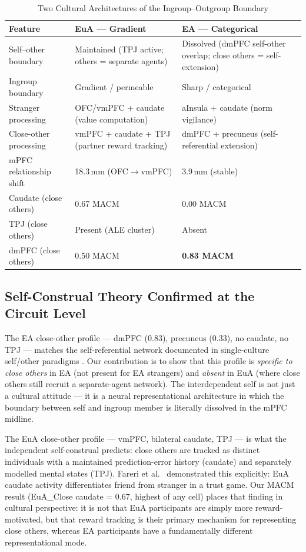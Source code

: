 \documentclass[11pt,a4paper]{article}
\begin{document}
\begin{table}[ht]
\centering\small
\caption{Two Cultural Architectures of the Ingroup--Outgroup Boundary}
\label{tab:architecture}
\renewcommand{\arraystretch}{1.4}
\begin{tabular}{p{3.5cm}p{5.0cm}p{5.5cm}}
\toprule
\textbf{Feature} & \textcolor{euaBlue}{\textbf{EuA — Gradient}} & \textcolor{eaRed}{\textbf{EA — Categorical}} \\
\midrule
Self--other boundary & Maintained (TPJ active; others = separate agents) & Dissolved (dmPFC self-other overlap; close others = self-extension) \\
Ingroup boundary & Gradient / permeable & Sharp / categorical \\
Stranger processing & OFC/vmPFC + caudate (value computation) & aInsula + caudate (norm vigilance) \\
Close-other processing & vmPFC + caudate + TPJ (partner reward tracking) & dmPFC + precuneus (self-referential extension) \\
mPFC relationship shift & 18.3\,mm (OFC$\to$vmPFC) & 3.9\,mm (stable) \\
Caudate (close others) & 0.67 MACM & 0.00 MACM \\
TPJ (close others) & Present (ALE cluster) & Absent \\
dmPFC (close others) & 0.50 MACM & \textbf{0.83 MACM} \\
\bottomrule
\end{tabular}
\end{table}

\subsection{Self-Construal Theory Confirmed at the Circuit Level}

The EA close-other profile — dmPFC (0.83), precuneus (0.33), no caudate, no TPJ — matches
the self-referential network documented in single-culture self/other paradigms
\citep{Zhu2007,Han2012,Wang2011}. Our contribution is to show that this profile is
\emph{specific to close others} in EA (not present for EA strangers) and \emph{absent} in EuA
(where close others still recruit a separate-agent network). The interdependent self is not
just a cultural attitude — it is a neural representational architecture in which the boundary
between self and ingroup member is literally dissolved in the mPFC midline.

The EuA close-other profile — vmPFC, bilateral caudate, TPJ — is what the independent
self-construal predicts: close others are tracked as distinct individuals with a maintained
prediction-error history (caudate) and separately modelled mental states (TPJ). Fareri et al.\
\citeyear{Fareri2012} demonstrated this explicitly: EuA caudate activity differentiates friend
from stranger in a trust game. Our MACM result (EuA\_Close caudate = 0.67, highest of any cell)
places that finding in cultural perspective: it is not that EuA participants are simply more
reward-motivated, but that reward tracking is their primary mechanism for representing close
others, whereas EA participants have a fundamentally different representational mode.
\end{document}
